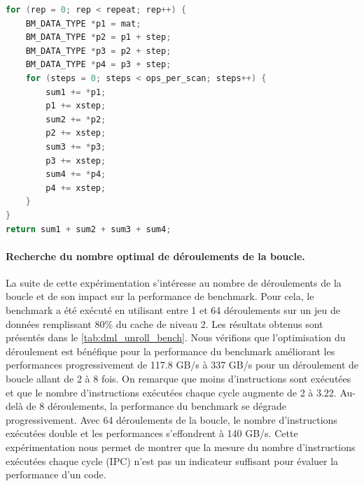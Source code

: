     \begin{lstlisting}[label=lst:dml_unroll_spe ,language=C, caption=Deuxième version du déroulement par 4 utilisant 4 variables sum.]
for (rep = 0; rep < repeat; rep++) {
    BM_DATA_TYPE *p1 = mat;
    BM_DATA_TYPE *p2 = p1 + step;
    BM_DATA_TYPE *p3 = p2 + step;
    BM_DATA_TYPE *p4 = p3 + step;
    for (steps = 0; steps < ops_per_scan; steps++) {
        sum1 += *p1;
        p1 += xstep;
        sum2 += *p2;
        p2 += xstep;
        sum3 += *p3;
        p3 += xstep;
        sum4 += *p4;
        p4 += xstep;
    }
}
return sum1 + sum2 + sum3 + sum4;
\end{lstlisting}
    
    \paragraph{Recherche du nombre optimal de déroulements de la boucle.}
    
        La suite de cette expérimentation s'intéresse au nombre de déroulements de la boucle et de son impact sur la performance de benchmark. Pour cela, le benchmark a été exécuté en utilisant entre 1 et 64 déroulements sur un jeu de données remplissant 80\% du cache de niveau 2. Les résultats obtenus sont présentés dans le \autoref{tab:dml_unroll_bench}. Nous vérifions que l'optimisation du déroulement est bénéfique pour la performance du benchmark améliorant les performances progressivement de 117.8 GB/s à 337 GB/s pour un déroulement de boucle allant de 2 à 8 fois. On remarque que moins d'instructions sont exécutées et que le nombre d'instructions exécutées chaque cycle augmente de 2 à 3.22. Au-delà de 8 déroulements, la performance du benchmark se dégrade progressivement. Avec 64 déroulements de la boucle, le nombre d'instructions exécutées double et les performances s'effondrent à 140 GB/s. Cette expérimentation nous permet de montrer que la mesure du nombre d'instructions exécutées chaque cycle (IPC) n'est pas un indicateur suffisant pour évaluer la performance d'un code. 
    
